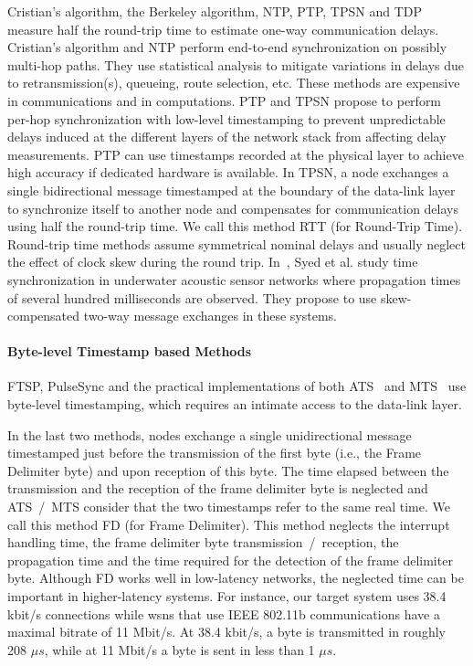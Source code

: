 Cristian's algorithm, the Berkeley algorithm, NTP, PTP, TPSN and TDP measure half the round-trip time to estimate one-way communication delays. Cristian's algorithm and NTP perform end-to-end synchronization on possibly multi-hop paths. They use statistical analysis to mitigate variations in delays due to retransmission(s), queueing, route selection, etc. These methods are expensive in communications and in computations. PTP and TPSN propose to perform per-hop synchronization with low-level timestamping to prevent unpredictable delays induced at the different layers of the network stack from affecting delay measurements. PTP can use timestamps recorded at the physical layer to achieve high accuracy if dedicated hardware is available. In TPSN, a node exchanges a single bidirectional message timestamped at the boundary of the data-link layer to synchronize itself to another node and compensates for communication delays using half the round-trip time. We call this method RTT (for Round-Trip Time). Round-trip time methods assume symmetrical nominal delays and usually neglect the effect of clock skew during the round trip. In~\cite{syed2006time}, Syed et al. study time synchronization in underwater acoustic sensor networks where propagation times of several hundred milliseconds are observed. They propose to use skew-compensated two-way message exchanges in these systems.


\paragraph{Byte-level Timestamp based Methods}

FTSP, PulseSync and the practical implementations of both ATS~\cite{schenato2011average} and MTS~\cite{he2014study} use byte-level time\hyph stamping, which requires an intimate access to the data-link layer.

In the last two methods, nodes exchange a single unidirectional message timestamped just before the transmission of the first byte (i.e., the Frame Delimiter byte) and upon reception of this byte. The time elapsed between the transmission and the reception of the frame delimiter byte is neglected and ATS~/~MTS consider that the two timestamps refer to the same real time. We call this method FD (for Frame Delimiter). This method neglects the interrupt handling time, the frame delimiter byte transmission~/~reception, the propagation time and the time required for the detection of the frame delimiter byte. Although FD works well in low-latency networks, the neglected time can be important in higher-latency systems. For instance, our target system uses 38.4 kbit/s connections while \glspl{wsn} that use IEEE 802.11b communications have a maximal bitrate of 11 Mbit/s.  At 38.4 kbit/s, a byte is transmitted in roughly 208 $\mu s$, while at 11 Mbit/s a byte is sent in less than 1 $\mu s$.

